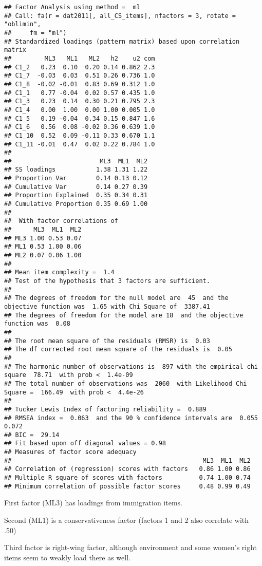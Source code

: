 \documentclass[
]{article}
\begin{document}
\begin{verbatim}
## Factor Analysis using method =  ml
## Call: fa(r = dat2011[, all_CS_items], nfactors = 3, rotate = "oblimin", 
##     fm = "ml")
## Standardized loadings (pattern matrix) based upon correlation matrix
##         ML3   ML1   ML2   h2    u2 com
## C1_2   0.23  0.10  0.20 0.14 0.862 2.3
## C1_7  -0.03  0.03  0.51 0.26 0.736 1.0
## C1_8  -0.02 -0.01  0.83 0.69 0.312 1.0
## C1_1   0.77 -0.04  0.02 0.57 0.435 1.0
## C1_3   0.23  0.14  0.30 0.21 0.795 2.3
## C1_4   0.00  1.00  0.00 1.00 0.005 1.0
## C1_5   0.19 -0.04  0.34 0.15 0.847 1.6
## C1_6   0.56  0.08 -0.02 0.36 0.639 1.0
## C1_10  0.52  0.09 -0.11 0.33 0.670 1.1
## C1_11 -0.01  0.47  0.02 0.22 0.784 1.0
## 
##                        ML3  ML1  ML2
## SS loadings           1.38 1.31 1.22
## Proportion Var        0.14 0.13 0.12
## Cumulative Var        0.14 0.27 0.39
## Proportion Explained  0.35 0.34 0.31
## Cumulative Proportion 0.35 0.69 1.00
## 
##  With factor correlations of 
##      ML3  ML1  ML2
## ML3 1.00 0.53 0.07
## ML1 0.53 1.00 0.06
## ML2 0.07 0.06 1.00
## 
## Mean item complexity =  1.4
## Test of the hypothesis that 3 factors are sufficient.
## 
## The degrees of freedom for the null model are  45  and the objective function was  1.65 with Chi Square of  3387.41
## The degrees of freedom for the model are 18  and the objective function was  0.08 
## 
## The root mean square of the residuals (RMSR) is  0.03 
## The df corrected root mean square of the residuals is  0.05 
## 
## The harmonic number of observations is  897 with the empirical chi square  78.71  with prob <  1.4e-09 
## The total number of observations was  2060  with Likelihood Chi Square =  166.49  with prob <  4.4e-26 
## 
## Tucker Lewis Index of factoring reliability =  0.889
## RMSEA index =  0.063  and the 90 % confidence intervals are  0.055 0.072
## BIC =  29.14
## Fit based upon off diagonal values = 0.98
## Measures of factor score adequacy             
##                                                    ML3  ML1  ML2
## Correlation of (regression) scores with factors   0.86 1.00 0.86
## Multiple R square of scores with factors          0.74 1.00 0.74
## Minimum correlation of possible factor scores     0.48 0.99 0.49
\end{verbatim}

First factor (ML3) has loadings from immigration items.

Second (ML1) is a conservativeness factor (factors 1 and 2 also
correlate with .50)

Third factor is right-wing factor, although environment and some women's
right items seem to weakly load there as well.
\end{document}
